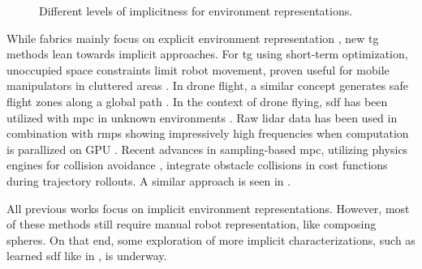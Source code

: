 \begin{figure}
  \centering
  
  \caption{Different levels of implicitness for environment representations.}
  \label{fig:ral24_overview}
\end{figure}

While \ac{fabrics} mainly focus on explicit environment
representation \cite{Spahn2023,Ratliff2020}, new \ac{tg}
methods lean towards implicit approaches. For \ac{tg} using
short-term optimization, unoccupied space constraints limit
robot movement, proven useful for mobile manipulators in
cluttered areas \cite{Spahn2021}. In drone flight, a similar
concept generates safe flight zones along a global path
\cite{Liu2017a,Tordesillas2019a}. In the context of drone
flying, \ac{sdf} has been utilized with \ac{mpc} in unknown
environments \cite{Oleynikova2017voxblox}. Raw lidar data
has been used in combination with \acp{rmp} showing
impressively high frequencies when computation is parallized
on GPU \cite{Pantic2023obstacle}. Recent advances in
sampling-based \ac{mpc}, utilizing physics engines for
collision avoidance \cite{Pezzato2023sampling}, integrate
obstacle collisions in cost functions during trajectory
rollouts. A similar approach is seen in
\cite{Sundaralingam2023curobo}.

All previous works focus on implicit environment
representations. However, most of these methods still
require manual robot representation, like composing spheres.
On that end, some exploration of more implicit
characterizations, such as learned \ac{sdf} like in
\cite{Liu2022regularized,Koptev2023neural}, is underway.
